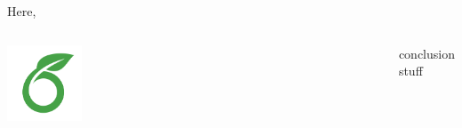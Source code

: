 \documentclass[25pt, a0paper, portrait]{tikzposter}
\begin{document}
\begin{columns}
    {
        
    }
    
    {
        Here, \blindtext \vspace{4cm}
    }
\end{columns}

\begin{columns}
    {
        \begin{tikzfigure}
            \includegraphics[width=0.2\textwidth]{images/overleaf-logo}
        \end{tikzfigure}
        \vspace{4cm}
    }
    {
        \blindtext
    }
    {
        conclusion stuff
    }
\end{columns}
{
    \blindtext
}
\end{document}

